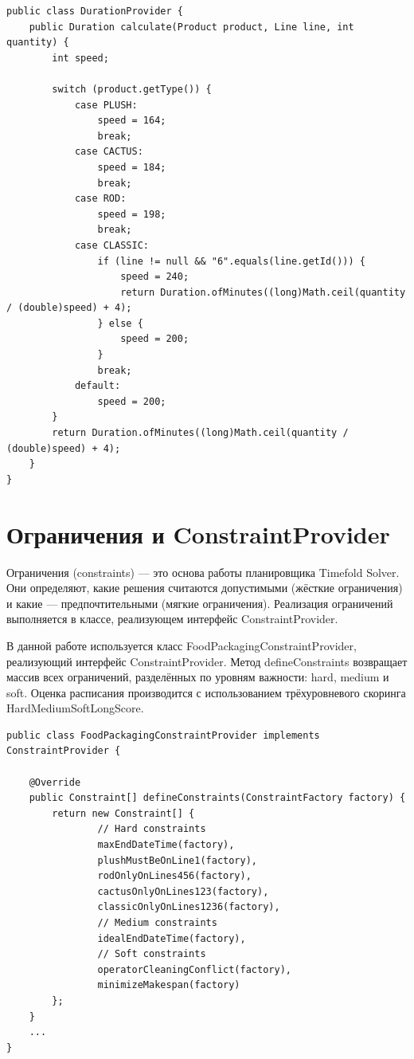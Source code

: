 \begin{lstlisting}[caption={класс DurationProvider}, label={lst:classDurationProvider}]
public class DurationProvider {
    public Duration calculate(Product product, Line line, int quantity) {
        int speed;

        switch (product.getType()) {
            case PLUSH:
                speed = 164;
                break;
            case CACTUS:
                speed = 184;
                break;
            case ROD:
                speed = 198;
                break;
            case CLASSIC:
                if (line != null && "6".equals(line.getId())) {
                    speed = 240;
                    return Duration.ofMinutes((long)Math.ceil(quantity / (double)speed) + 4);
                } else {
                    speed = 200;
                }
                break;
            default:
                speed = 200;
        }
        return Duration.ofMinutes((long)Math.ceil(quantity / (double)speed) + 4);
    }
}
\end{lstlisting}

\section{Ограничения и ConstraintProvider}

Ограничения (constraints) — это основа работы планировщика Timefold Solver. Они определяют, какие решения считаются допустимыми (жёсткие ограничения) и какие — предпочтительными (мягкие ограничения). Реализация ограничений выполняется в классе, реализующем интерфейс ConstraintProvider.

В данной работе используется класс FoodPackagingConstraintProvider, реализующий интерфейс ConstraintProvider. Метод defineConstraints возвращает массив всех ограничений, разделённых по уровням важности: hard, medium и soft. Оценка расписания производится с использованием трёхуровневого скоринга HardMediumSoftLongScore.

\begin{lstlisting}[caption={класс FoodPackagingConstraintProvider}, label={lst:classConstraintProvider}]
public class FoodPackagingConstraintProvider implements ConstraintProvider {

    @Override
    public Constraint[] defineConstraints(ConstraintFactory factory) {
        return new Constraint[] {
                // Hard constraints
                maxEndDateTime(factory),
                plushMustBeOnLine1(factory),
                rodOnlyOnLines456(factory),
                cactusOnlyOnLines123(factory),
                classicOnlyOnLines1236(factory),
                // Medium constraints
                idealEndDateTime(factory),
                // Soft constraints
                operatorCleaningConflict(factory),
                minimizeMakespan(factory)
        };
    }
    ...
}
\end{lstlisting}

